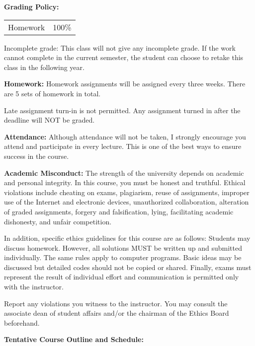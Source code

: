 \documentclass[a4paper,10pt]{article}
\begin{document}
\textbf{Grading Policy:}

\begin{tabular}{lr}
Homework & 100\%\\
\end{tabular}




Incomplete grade: This class will not give any
incomplete grade. If the work cannot complete in the
current semester, the student can choose to retake this
class in the following year.






\textbf{Homework:} Homework assignments will be assigned every three weeks. There are 5 sets of homework in total. 

Late assignment turn-in is not permitted. Any assignment turned in after the deadline will NOT be graded.




\textbf{Attendance:} Although attendance will not be taken, I strongly encourage you attend and participate in every lecture. This is one of the best ways to ensure success in the course.






\textbf{Academic Misconduct:} The strength of the university depends on academic and personal integrity. In this course, you must be honest 
and truthful. Ethical violations include cheating on exams, plagiarism, reuse of assignments, improper use 
of the Internet and electronic devices, unauthorized collaboration, alteration of graded assignments, forgery 
and falsification, lying, facilitating academic dishonesty, and unfair competition.

In addition, specific ethics guidelines for this course are as follows: Students may discuss homework. However, 
all solutions MUST be written up and submitted individually. The same rules apply to computer programs. 
Basic ideas may be discussed but detailed codes should not be copied or shared. Finally, exams must 
represent the result of individual effort and communication is permitted only with the instructor.

Report any violations you witness to the instructor. You may consult the associate dean of student affairs 
and/or the chairman of the Ethics Board beforehand. 

\textbf{Tentative Course Outline and Schedule:}
\end{document}
